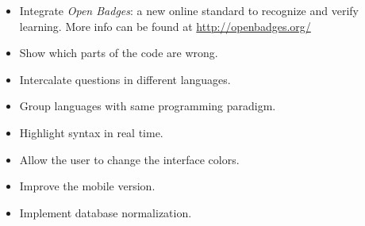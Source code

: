 \begin{itemize}
\item Integrate \textit{Open Badges}: a new online standard to recognize and verify learning. More info can be found at \url{http://openbadges.org/}

\item Show which parts of the code are wrong.

\item Intercalate questions in different languages.

\item Group languages with same programming paradigm.

\item Highlight syntax in real time.

\item Allow the user to change the interface colors.

\item Improve the mobile version.

\item Implement database normalization.

\end{itemize}